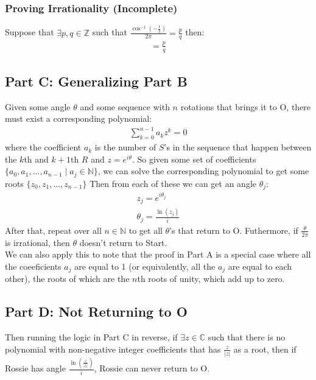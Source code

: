 \documentclass{article}
\begin{document}
  \subsubsection{Proving Irrationality (Incomplete)}
  Suppose that $\exists p, q \in \mathbb{Z}$ such that $\frac{\cos^{-1}(-\frac{1}{3})}{2\pi} = \frac{p}{q}$ then:
  \begin{align}
    = \frac{p}{q} 
  \end{align}
  \subsection{Part C: Generalizing Part B}
  Given some angle $\theta$ and some sequence with $n$ rotations that brings it to O, there must exist a corresponding polynomial:
  \begin{align}
    \sum^{n-1}_{k=0}a_kz^k = 0
  \end{align}
  where the coefficient $a_k$ is the number of $S$'s in the sequence that happen between the $k$th and $k+1$th $R$ and $z = e^{i\theta}$. So given some set of coefficients $\{a_0, a_1, ..., a_{n-1} \mid a_j \in \mathbb{N}\}$, we can solve the corresponding polynomial to get some roots $\{z_0, z_1, ..., z_{n-1}\}$ Then from each of these we can get an angle $\theta_j$:
  \begin{align}
    z_j = e^{i\theta_j}\\
    \theta_j = \frac{\ln(z_j)}{i}
  \end{align}
  After that, repeat over all $ n \in \mathbb{N}$ to get all $\theta$'s that return to O. Futhermore, if $\frac{\theta}{2\pi}$ is irrational, then $\theta$ doesn't return to Start.\\
  
  We can also apply this to note that the proof in Part A is a special case where all the coeeficients $a_j$ are equal to 1 (or equivalently, all the $a_j$ are equal to each other), the roots of which are the $n$th roots of unity, which add up to zero.
  \subsection{Part D: Not Returning to O}
  Then running the logic in Part C in reverse, if $\exists z \in \mathbb{C}$ such that there is no polynomial with non-negative integer coefficients that has $\frac{z}{\lvert z \rvert}$ as a root, then if Rossie has angle $\frac{\ln(\frac{z}{\lvert z \rvert})}{i}$, Rossie can never return to O.
\end{document}
